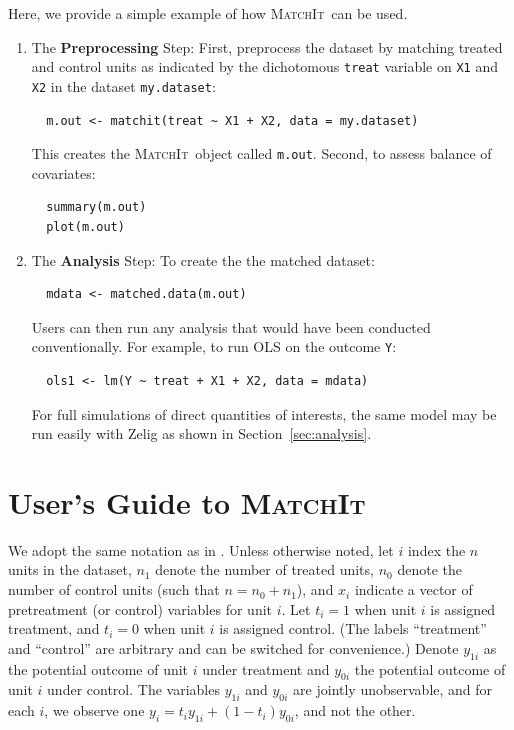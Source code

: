 \documentclass[oneside,letterpaper,titlepage]{article}
\newcommand{\MatchIt}{\textsc{MatchIt}}
\begin{document}
Here, we provide a simple example of how \MatchIt\ can be used. 

\begin{enumerate}
  
\item The {\bf Preprocessing} Step: First, preprocess the dataset by matching
  treated and control units as indicated by the dichotomous
  \texttt{treat} variable on \texttt{X1} and \texttt{X2} in the
  dataset \texttt{my.dataset}:
\begin{verbatim}
  m.out <- matchit(treat ~ X1 + X2, data = my.dataset)
\end{verbatim}
  This creates the \MatchIt\ object called \texttt{m.out}.  Second, to
  assess balance of covariates:
\begin{verbatim}
  summary(m.out)
  plot(m.out)
\end{verbatim}

\item The {\bf  Analysis} Step: To create the the matched dataset: 
\begin{verbatim}
  mdata <- matched.data(m.out)
\end{verbatim}
  Users can then run any analysis that would have been conducted
  conventionally.  For example, to run OLS on the outcome \texttt{Y}:
\begin{verbatim}
  ols1 <- lm(Y ~ treat + X1 + X2, data = mdata)
\end{verbatim}
For full simulations of direct quantities of interests, the same model
may be run easily with Zelig as shown in Section~\ref{sec:analysis}.
\end{enumerate}


\section{User's Guide to \MatchIt}
\label{methods}

We adopt the same notation as in \citet{HoImaKin05}. Unless otherwise
noted, let $i$ index the $n$ units in the dataset, $n_1$ denote the
number of treated units, $n_0$ denote the number of control units
(such that $n=n_0+n_1$), and $x_i$ indicate a vector of pretreatment
(or control) variables for unit $i$.  Let $t_i=1$ when unit $i$ is
assigned treatment, and $t_i=0$ when unit $i$ is assigned control.
(The labels ``treatment'' and ``control'' are arbitrary and can be
switched for convenience.)  Denote $y_{1i}$ as the potential outcome
of unit $i$ under treatment and $y_{0i}$ the potential outcome of unit
$i$ under control.  The variables $y_{1i}$ and $y_{0i}$ are jointly
unobservable, and for each $i$, we observe one
$y_i=t_iy_{1i}+(1-t_i)y_{0i}$, and not the other.
\end{document}
